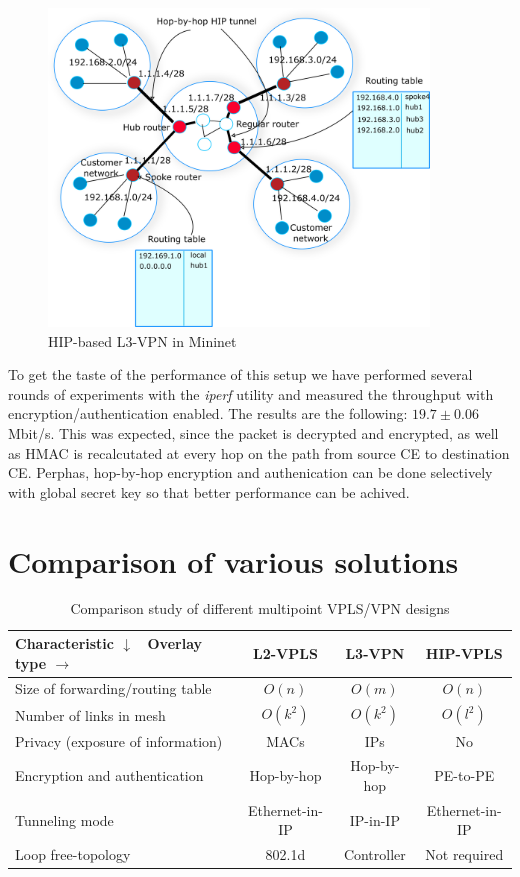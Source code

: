 \begin{figure}[!ht]
    \centering
    \includegraphics[width=0.9\textwidth]{graphics/l3-vpn.png}
    \caption{HIP-based L3-VPN in Mininet}
    \label{fig:l3vpn}
\end{figure}

To get the taste of the performance of this setup we have performed 
several rounds of experiments with the {\it iperf} utility and measured
the throughput with encryption/authentication enabled. The results 
are the following: $19.7 \pm 0.06$ Mbit/s. This was expected, since the packet
is decrypted and encrypted, as well as HMAC is recalcutated at every hop on 
the path from source CE to destination CE. Perphas, hop-by-hop encryption and authenication can
be done selectively with global secret key so that better performance can be achived.

\section{Comparison of various solutions}

\begin{table}
    \small
    \begin{tabular}{|l|c|c|c|}
    \hline
    Characteristic $\downarrow$ \ Overlay type $\rightarrow$ & L2-VPLS & L3-VPN & HIP-VPLS \\\hline
    Size of forwarding/routing table & $O(n)$ & $O(m)$ & $O(n)$\\\hline
    Number of links in mesh & $O(k^2)$ & $O(k^2)$ & $O(l^2)$ \\\hline
    Privacy (exposure of information) & MACs & IPs & No \\\hline
    Encryption and authentication & Hop-by-hop & Hop-by-hop & PE-to-PE \\\hline
    Tunneling mode & Ethernet-in-IP & IP-in-IP & Ethernet-in-IP \\\hline
    Loop free-topology & 802.1d & Controller & Not required \\\hline
    \end{tabular}
    \caption {Comparison study of different multipoint VPLS/VPN designs}
    \label{analysis}
\end{table}

